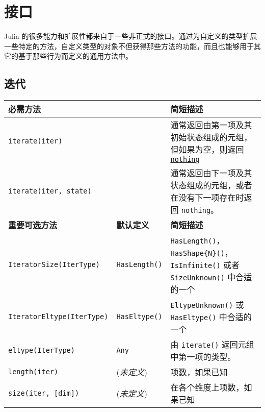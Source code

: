 \hypertarget{5506253490972465797}{}


\chapter{接口}



Julia 的很多能力和扩展性都来自于一些非正式的接口。通过为自定义的类型扩展一些特定的方法，自定义类型的对象不但获得那些方法的功能，而且也能够用于其它的基于那些行为而定义的通用方法中。



\hypertarget{5510379658285713272}{}


\section{迭代}




\begin{table}[h]

\begin{tabulary}{\linewidth}{|L|L|L|}
\hline
必需方法 &  & 简短描述 \\
\hline
\texttt{iterate(iter)} &  & 通常返回由第一项及其初始状态组成的元组，但如果为空，则返回 \hyperlink{9331422207248206047}{\texttt{nothing}} \\
\hline
\texttt{iterate(iter, state)} &  & 通常返回由下一项及其状态组成的元组，或者在没有下一项存在时返回 \texttt{nothing}。 \\
\hline
\textbf{重要可选方法} & \textbf{默认定义} & \textbf{简短描述} \\
\hline
\texttt{IteratorSize(IterType)} & \texttt{HasLength()} & \texttt{HasLength()}，\texttt{HasShape\{N\}()}，\texttt{IsInfinite()} 或者 \texttt{SizeUnknown()} 中合适的一个 \\
\hline
\texttt{IteratorEltype(IterType)} & \texttt{HasEltype()} & \texttt{EltypeUnknown()} 或 \texttt{HasEltype()} 中合适的一个 \\
\hline
\texttt{eltype(IterType)} & \texttt{Any} & 由 \texttt{iterate()} 返回元组中第一项的类型。 \\
\hline
\texttt{length(iter)} & (\emph{未定义}) & 项数，如果已知 \\
\hline
\texttt{size(iter, [dim])} & (\emph{未定义}) & 在各个维度上项数，如果已知 \\
\hline
\end{tabulary}

\end{table}




